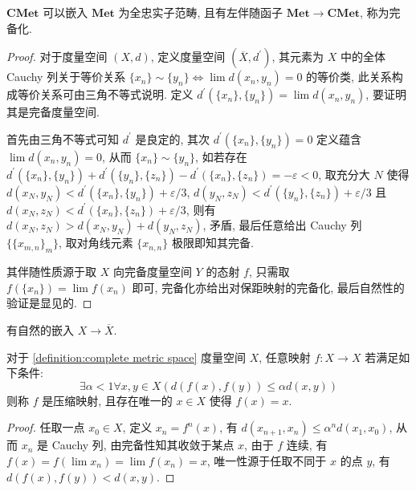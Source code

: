 \begin{definition}[完备化]
    \label {definition:completion of metric space}
    \(\mathbf{CMet}\) 可以嵌入 \(\mathbf{Met}\) 为全忠实子范畴, 且有左伴随函子 \(\mathbf{Met} \to \mathbf{CMet}\), 称为完备化.

    \begin{proof}
        对于度量空间 \((X,d)\), 定义度量空间 \((\overline{X},d^\prime)\), 其元素为 \(X\) 中的全体 Cauchy 列关于等价关系 \(\{x_n\} \sim \{y_n\} \iff \lim d(x_n,y_n) = 0\) 的等价类,
        此关系构成等价关系可由三角不等式说明. 定义 \(d^\prime (\{x_n\},\{y_n\}) = \lim d(x_n,y_n)\), 要证明其是完备度量空间.

        首先由三角不等式可知 \(d^\prime\) 是良定的, 其次 \(d^\prime (\{x_n\},\{y_n\}) = 0\) 定义蕴含 \(\lim d(x_n,y_n) = 0\), 从而 \(\{x_n\} \sim \{y_n\}\),
        如若存在 \(d^\prime (\{x_n\},\{y_n\}) + d^\prime (\{y_n\},\{z_n\}) - d^\prime (\{x_n\},\{z_n\}) = -\varepsilon < 0\), 取充分大 \(N\) 使得 \(d(x_N,y_N) < d^\prime (\{x_n\},\{y_n\}) + \varepsilon/3\), 
        \(d(y_N,z_N) < d^\prime (\{y_n\},\{z_n\}) + \varepsilon/3\) 且 \(d(x_N,z_N) < d^\prime (\{x_n\},\{z_n\}) + \varepsilon/3\), 则有 \(d(x_N,z_N) > d(x_N,y_N) + d(y_N,z_N)\), 矛盾, 最后任意给出 Cauchy 列 \(\{\{x_{m,n}\}_m\}\),
        取对角线元素 \(\{x_{n,n}\}\) 极限即知其完备.

        其伴随性质源于取 \(X\) 向完备度量空间 \(Y\) 的态射 \(f\), 只需取 \(f(\{x_n\}) = \lim f(x_n)\) 即可, 完备化亦给出对保距映射的完备化,
        最后自然性的验证是显见的.
    \end{proof}
\end{definition}

\begin{corollary}
    有自然的嵌入 \(X \to \overline{X}\).
\end{corollary}

\begin{theorem}[压缩映射原理]
    \label {theorem:contraction mapping principle}
    对于 \ref{definition:complete metric space} 度量空间 \(X\), 任意映射 \(f : X \to X\) 若满足如下条件:
    \[
        \exists \alpha < 1 \forall x,y \in X (d(f(x),f(y)) \le \alpha d(x,y))
    \]
    则称 \(f\) 是压缩映射, 且存在唯一的 \(x \in X\) 使得 \(f(x) = x\).

    \begin{proof}
        任取一点 \(x_0 \in X\), 定义 \(x_n = f^n (x)\), 有 \(d(x_{n+1},x_n) \le \alpha^n d(x_1,x_0)\), 从而 \(x_n\) 是 Cauchy 列, 由完备性知其收敛于某点 \(x\),
        由于 \(f\) 连续, 有 \(f(x) = f(\lim x_n) = \lim f(x_n) = x\), 唯一性源于任取不同于 \(x\) 的点 \(y\), 有 \(d(f(x),f(y)) < d(x,y)\).
    \end{proof}
\end{theorem}


